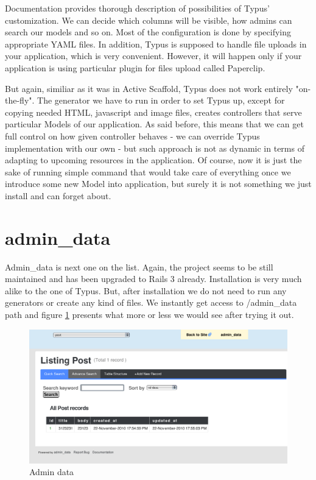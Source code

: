     Documentation provides thorough description of possibilities of Typus' customization. We can decide which columns will be visible, how admins can search our models and so on. Most of the configuration is done by specifying appropriate YAML files. In addition, Typus is supposed to handle file uploads in your application, which is very convenient. However, it will happen only if your application is using particular plugin for files upload called Paperclip.
    
    But again, similiar as it was in Active Scaffold, Typus does not work entirely "on-the-fly". The generator we have to run in order to set Typus up, except for copying needed HTML, javascript and image files, creates controllers that serve particular Models of our application. As said before, this means that we can get full control on how given controller behaves - we can override Typus implementation with our own - but such approach is not as dynamic in terms of adapting to upcoming resources in the application. Of course, now it is just the sake of running simple command that would take care of everything once we introduce some new Model into application, but surely it is not something we just install and can forget about.
    
    \section{admin\_data}
    Admin\_data is next one on the list. Again, the project seems to be still maintained and has been upgraded to Rails 3 already. Installation is very much alike to the one of Typus. But, after installation we do not need to run any generators or create any kind of files. We instantly get access to /admin\_data path and figure \ref{admindata1} presents what more or less we would see after trying it out.
     
    \begin{figure}[hbt!]
  		\begin{center}
  			\includegraphics[width=\linewidth]{images/chapter01/admindata1.png}
  			\caption{Admin data}
  			\label{admindata1}
  		\end{center}
  	\end{figure}
  
